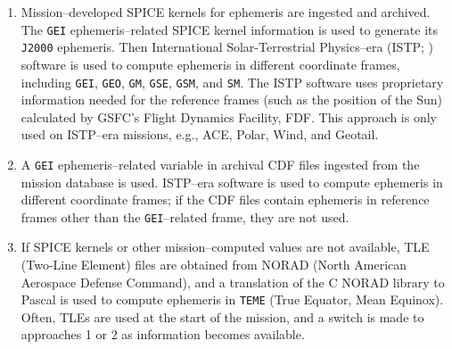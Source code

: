 \documentclass[draft]{agujournal2019}
\begin{document}
\begin{enumerate}
    \parskip 0.1in 

    \item Mission--developed SPICE kernels for ephemeris are ingested and archived. The \texttt{GEI} ephemeris--related SPICE kernel information is used to generate its \texttt{J2000} ephemeris. Then International Solar-Terrestrial Physics--era (ISTP; ) software is used to compute ephemeris in different coordinate frames, including \texttt{GEI}, \texttt{GEO}, \texttt{GM}, \texttt{GSE}, \texttt{GSM}, and \texttt{SM}. The ISTP software uses proprietary information needed for the reference frames (such as the position of the Sun) calculated by GSFC's Flight Dynamics Facility, FDF.  This approach is only used on ISTP--era missions, e.g., ACE, Polar, Wind, and Geotail.

    \item A \texttt{GEI} ephemeris--related variable in archival CDF files ingested from the mission database is used. ISTP--era software is used to compute ephemeris in different coordinate frames; if the CDF files contain ephemeris in reference frames other than the \texttt{GEI}--related frame, they are not used.

    \item If SPICE kernels or other mission--computed values are not available, TLE (Two-Line Element) files are obtained from NORAD (North American Aerospace Defense Command), and a translation of the C NORAD library to Pascal \cite{NORADSGP4c} is used to compute ephemeris in \texttt{TEME} (True Equator, Mean Equinox). Often, TLEs are used at the start of the mission, and a switch is made to approaches 1 or 2 as information becomes available.
    

\end{enumerate}
\end{document}
